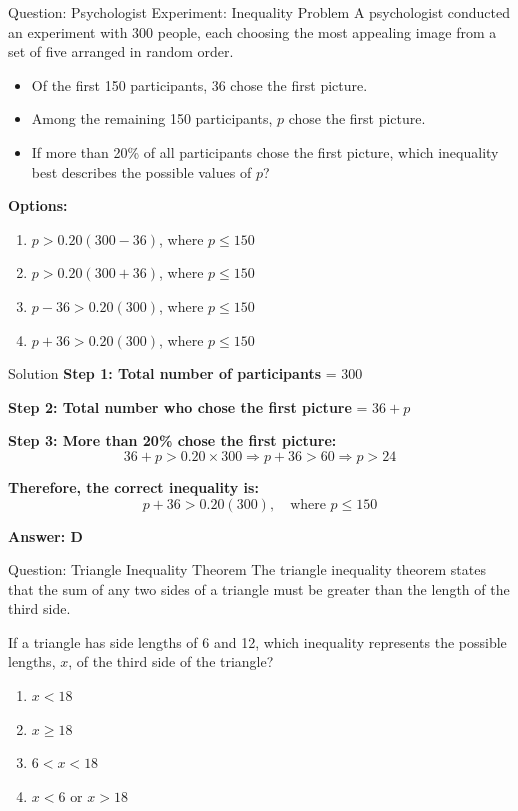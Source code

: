 \documentclass{beamer}
\begin{document}
\begin{frame}{Question: Psychologist Experiment: Inequality Problem}
\small
A psychologist conducted an experiment with 300 people, each choosing the most appealing image from a set of five arranged in random order.

\begin{itemize}
    \item Of the first 150 participants, 36 chose the first picture.
    \item Among the remaining 150 participants, $p$ chose the first picture.
    \item If more than 20\% of all participants chose the first picture, which inequality best describes the possible values of $p$?
\end{itemize}

\textbf{Options:}
\begin{enumerate}
    \item[A.] $p > 0.20(300 - 36)$, where $p \leq 150$
    \item[B.] $p > 0.20(300 + 36)$, where $p \leq 150$
    \item[C.] $p - 36 > 0.20(300)$, where $p \leq 150$
    \item[D.] $p + 36 > 0.20(300)$, where $p \leq 150$
\end{enumerate}
\end{frame}



\begin{frame}{Solution}
\small
\textbf{Step 1: Total number of participants} = 300

\textbf{Step 2: Total number who chose the first picture} = $36 + p$

\textbf{Step 3: More than 20\% chose the first picture:}
\[
36 + p > 0.20 \times 300
\Rightarrow p + 36 > 60
\Rightarrow p > 24
\]

\textbf{Therefore, the correct inequality is:}
\[
\boxed{p + 36 > 0.20(300)}, \quad \text{where } p \leq 150
\]

\textbf{Answer: D}
\end{frame}

\begin{frame}{Question: Triangle Inequality Theorem}
\small
The triangle inequality theorem states that the sum of any two sides of a triangle must be greater than the length of the third side.

If a triangle has side lengths of 6 and 12, which inequality represents the possible lengths, $x$, of the third side of the triangle?

\begin{enumerate}
    \item[A.] $x < 18$
    \item[B.] $x \geq 18$
    \item[C.] $6 < x < 18$
    \item[D.] $x < 6 \text{ or } x > 18$
\end{enumerate}
\end{frame}
\end{document}

